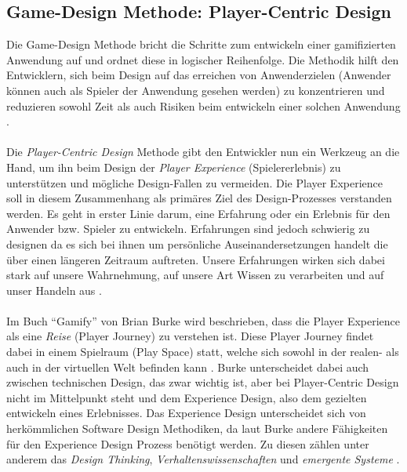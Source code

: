 \documentclass[a4paper,12pt,twoside]{scrartcl}
\begin{document}
\subsection{Game-Design Methode: Player-Centric Design}
\label{Player-Centric Methode}
Die Game-Design Methode bricht die Schritte zum entwickeln einer gamifizierten Anwendung auf und ordnet diese in logischer Reihenfolge. Die Methodik hilft den Entwicklern, sich beim Design auf das erreichen von Anwenderzielen (Anwender können auch als Spieler der Anwendung gesehen werden) zu konzentrieren und reduzieren sowohl Zeit als auch Risiken beim entwickeln einer solchen Anwendung \cite{gamificationDefinition}.
\\\\
Die \textit{Player-Centric Design} Methode gibt den Entwickler nun ein Werkzeug an die Hand, um ihn beim Design der \textit{Player Experience} (Spielererlebnis) zu unterstützen und mögliche Design-Fallen zu vermeiden. Die Player Experience soll in diesem Zusammenhang als primäres Ziel des Design-Prozesses verstanden werden. Es geht in erster Linie darum, eine Erfahrung oder ein Erlebnis für den Anwender bzw. Spieler zu entwickeln. Erfahrungen sind jedoch schwierig zu designen da es sich bei ihnen um persönliche Auseinandersetzungen handelt die über einen längeren Zeitraum auftreten. Unsere Erfahrungen wirken sich dabei stark auf unsere Wahrnehmung, auf unsere Art Wissen zu verarbeiten und auf unser Handeln aus \cite{gamificationDefinition}.
\\\\ 
Im Buch \enquote{Gamify} von Brian Burke wird beschrieben, dass die Player Experience als eine \textit{Reise} (Player Journey) zu verstehen ist. Diese Player Journey findet dabei in einem Spielraum (Play Space) statt, welche sich sowohl in der realen- als auch in der virtuellen Welt befinden kann \cite{gamificationDefinition}. Burke unterscheidet dabei auch zwischen technischen Design, das zwar wichtig ist, aber bei Player-Centric Design nicht im Mittelpunkt steht und dem Experience Design, also dem gezielten entwickeln eines Erlebnisses. Das Experience Design unterscheidet sich von herkömmlichen Software Design Methodiken, da laut Burke andere Fähigkeiten für den Experience Design Prozess benötigt werden. Zu diesen zählen unter anderem das \textit{Design Thinking}, \textit{Verhaltenswissenschaften} und \textit{emergente Systeme} \cite{gamificationDefinition}.
\\\\
\end{document}
